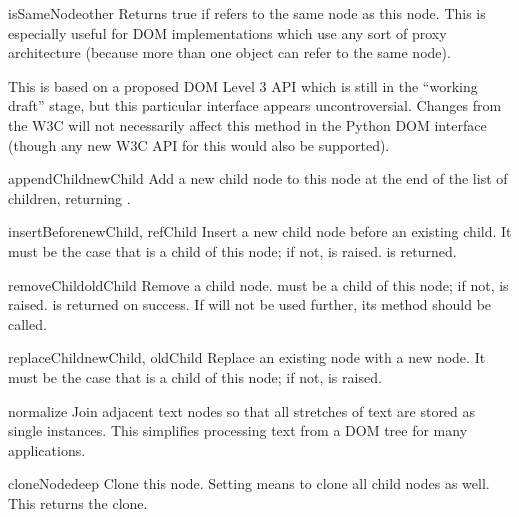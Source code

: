 \begin{methoddesc}[Node]{isSameNode}{other}
Returns true if  refers to the same node as this node.
This is especially useful for DOM implementations which use any sort
of proxy architecture (because more than one object can refer to the
same node).

  This is based on a proposed DOM Level 3 API which is
still in the ``working draft'' stage, but this particular interface
appears uncontroversial.  Changes from the W3C will not necessarily
affect this method in the Python DOM interface (though any new W3C
API for this would also be supported).
\end{methoddesc}

\begin{methoddesc}[Node]{appendChild}{newChild}
Add a new child node to this node at the end of the list of children,
returning .
\end{methoddesc}

\begin{methoddesc}[Node]{insertBefore}{newChild, refChild}
Insert a new child node before an existing child.  It must be the case
that  is a child of this node; if not,
 is raised.   is returned.
\end{methoddesc}

\begin{methoddesc}[Node]{removeChild}{oldChild}
Remove a child node.   must be a child of this node; if
not,  is raised.   is returned on
success.  If  will not be used further, its
 method should be called.
\end{methoddesc}

\begin{methoddesc}[Node]{replaceChild}{newChild, oldChild}
Replace an existing node with a new node. It must be the case that 
 is a child of this node; if not,
 is raised.
\end{methoddesc}

\begin{methoddesc}[Node]{normalize}{}
Join adjacent text nodes so that all stretches of text are stored as
single  instances.  This simplifies processing text from a
DOM tree for many applications.
\end{methoddesc}

\begin{methoddesc}[Node]{cloneNode}{deep}
Clone this node.  Setting  means to clone all child nodes as
well.  This returns the clone.
\end{methoddesc}


